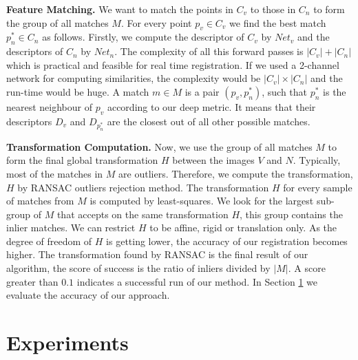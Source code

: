 \documentclass[10pt,twocolumn,letterpaper]{article}
\begin{document}
\textbf{Feature Matching.}
We want to match the points in $C_v$ to those in $C_n$ to form the group of all matches $M$. For every point $p_v \in C_v$ we find the best match $p^*_n\in C_n$ as follows. Firstly, we compute the descriptor of $C_v$ by $Net_v$ and the descriptors of $C_n$ by $Net_n$. The complexity of all this forward passes is $|C_v|+|C_n|$ which is practical and feasible for real time registration. If we used a 2-channel network for computing similarities, the complexity would be $|C_v|\times|C_n|$ and the run-time would be huge. A match $m \in M$ is a pair $(p_v,p^*_n)$, such that $p^*_n$ is the nearest neighbour of $p_v$ according to our deep metric. It means that their descriptors $D_v$ and $D_{p^*_n}$ are the closest out of all other possible matches.

\textbf{Transformation Computation.}
Now, we use the group of all matches $M$ to form the final global transformation $H$ between the images $V$ and $N$. Typically, most of the matches in $M$ are outliers. Therefore, we compute the transformation, $H$ by RANSAC \cite{ransac} outliers rejection method. The transformation $H$ for every sample of matches from $M$ is computed by least-squares. We look for the largest sub-group of $M$ that accepts on the same transformation $H$, this group contains the inlier matches. We can restrict $H$ to be affine, rigid or translation only. As the degree of freedom of $H$ is getting lower, the accuracy of our registration becomes higher. The transformation found by RANSAC is the final result of our algorithm, the score of success is the ratio of inliers divided by $|M|$. A score greater than $0.1$ indicates a successful run of our method. In Section \ref{sec:experimetns} we evaluate the accuracy of our approach.

\section{Experiments} \label{sec:experimetns}
\end{document}
